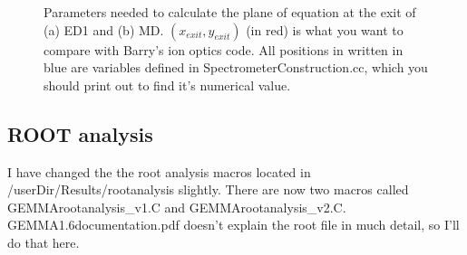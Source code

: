 \documentclass[letter,11pt]{article}
\begin{document}
\begin{figure}
\centering
	\caption{Parameters needed to calculate the plane of equation at the exit of (a) ED1 and (b) MD. $(x_{exit},y_{exit})$ (in red) is what you want to compare with Barry's ion optics code. All positions in written in blue are variables defined in SpectrometerConstruction.cc, which you should print out to find it's numerical value.}
	\label{fig:plane}
\end{figure}

\subsection{ROOT analysis}

I have changed the the root analysis macros located in /userDir/Results/rootanalysis slightly. There are now two macros called GEMMArootanalysis\_v1.C and GEMMArootanalysis\_v2.C. GEMMA1.6documentation.pdf doesn't explain the root file in much detail, so I'll do that here. 
\end{document}
